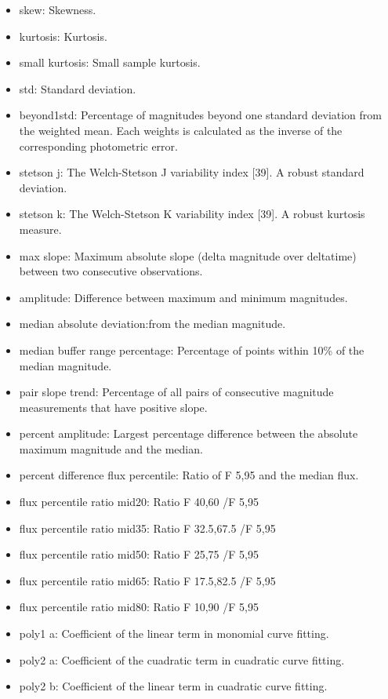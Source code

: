 \begin{itemize}
  \item skew: Skewness.
  \item kurtosis: Kurtosis.
  \item small kurtosis: Small sample kurtosis.
  \item std: Standard deviation.
  \item beyond1std: Percentage of magnitudes beyond one standard deviation from the weighted mean. Each weights is calculated as the inverse of the corresponding photometric error.
  \item stetson j: The Welch-Stetson J variability index [39]. A robust standard deviation.
  \item stetson k: The Welch-Stetson K variability index [39]. A robust kurtosis measure.
  \item max slope: Maximum absolute slope (delta magnitude over deltatime) between two consecutive observations.
  \item amplitude: Difference between maximum and minimum magnitudes.
  \item median absolute deviation:from the median magnitude.
  \item median buffer range percentage: Percentage of points within 10\% of the median magnitude.
  \item pair slope trend: Percentage of all pairs of consecutive magnitude measurements that have positive slope.
  \item percent amplitude: Largest percentage difference between the absolute maximum magnitude and the median.
  \item percent difference flux percentile: Ratio of F 5,95 and the median flux.
  \item flux percentile ratio mid20: Ratio F 40,60 /F 5,95
  \item flux percentile ratio mid35: Ratio F 32.5,67.5 /F 5,95
  \item flux percentile ratio mid50: Ratio F 25,75 /F 5,95
  \item flux percentile ratio mid65: Ratio F 17.5,82.5 /F 5,95
  \item flux percentile ratio mid80: Ratio F 10,90 /F 5,95
  \item poly1 a: Coefficient of the linear term in monomial curve fitting.
  \item poly2 a: Coefficient of the cuadratic term in cuadratic curve fitting.
  \item poly2 b: Coefficient of the linear term in cuadratic curve fitting.

\end{itemize}
